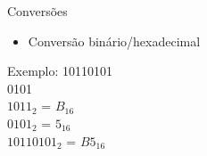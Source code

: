 

\begin{frame}{Conversões}
    \begin{itemize}
        \item Conversão binário/hexadecimal
    \end{itemize}
    Exemplo: 10110101 \\[0.2cm]
     0101 \\[0.2cm]
    $1011_{2}$ = $B_{16}$ \\[0.2cm]
    $0101_{2}$ = $5_{16}$ \\[0.2cm]
    $10110101_{2}$ = $B5_{16}$
\end{frame}